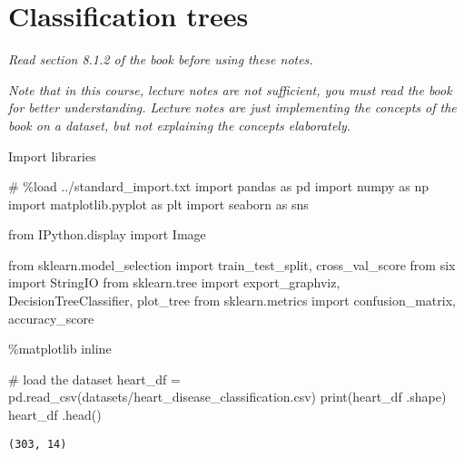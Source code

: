 \documentclass[
  letterpaper,
  DIV=11,
  numbers=noendperiod]{scrreprt}
\newenvironment{Shaded}{\begin{snugshade}}{\end{snugshade}}
\newcommand{\BuiltInTok}[1]{\textcolor[rgb]{0.00,0.23,0.31}{#1}}
\newcommand{\CommentTok}[1]{\textcolor[rgb]{0.37,0.37,0.37}{#1}}
\newcommand{\ImportTok}[1]{\textcolor[rgb]{0.00,0.46,0.62}{#1}}
\newcommand{\NormalTok}[1]{\textcolor[rgb]{0.00,0.23,0.31}{#1}}
\newcommand{\OperatorTok}[1]{\textcolor[rgb]{0.37,0.37,0.37}{#1}}
\newcommand{\StringTok}[1]{\textcolor[rgb]{0.13,0.47,0.30}{#1}}
\begin{document}
\chapter{Classification trees}\label{classification-trees}

\emph{Read section 8.1.2 of the book before using these notes.}

\emph{Note that in this course, lecture notes are not sufficient, you
must read the book for better understanding. Lecture notes are just
implementing the concepts of the book on a dataset, but not explaining
the concepts elaborately.}

Import libraries

\begin{Shaded}
\begin{Highlighting}[]
\CommentTok{\# \%load ../standard\_import.txt}
\ImportTok{import}\NormalTok{ pandas }\ImportTok{as}\NormalTok{ pd}
\ImportTok{import}\NormalTok{ numpy }\ImportTok{as}\NormalTok{ np}
\ImportTok{import}\NormalTok{ matplotlib.pyplot }\ImportTok{as}\NormalTok{ plt}
\ImportTok{import}\NormalTok{ seaborn }\ImportTok{as}\NormalTok{ sns}

\ImportTok{from}\NormalTok{ IPython.display }\ImportTok{import}\NormalTok{ Image}

\ImportTok{from}\NormalTok{ sklearn.model\_selection }\ImportTok{import}\NormalTok{ train\_test\_split, cross\_val\_score}
\ImportTok{from}\NormalTok{ six }\ImportTok{import}\NormalTok{ StringIO}
\ImportTok{from}\NormalTok{ sklearn.tree }\ImportTok{import}\NormalTok{ export\_graphviz, DecisionTreeClassifier, plot\_tree}
\ImportTok{from}\NormalTok{ sklearn.metrics }\ImportTok{import}\NormalTok{ confusion\_matrix, accuracy\_score}

\OperatorTok{\%}\NormalTok{matplotlib inline}
\end{Highlighting}
\end{Shaded}

\begin{Shaded}
\begin{Highlighting}[]
\CommentTok{\# load the dataset}
\NormalTok{heart\_df  }\OperatorTok{=}\NormalTok{ pd.read\_csv(}\StringTok{\textquotesingle{}datasets/heart\_disease\_classification.csv\textquotesingle{}}\NormalTok{)}
\BuiltInTok{print}\NormalTok{(heart\_df .shape)}
\NormalTok{heart\_df .head()}
\end{Highlighting}
\end{Shaded}

\begin{verbatim}
(303, 14)
\end{verbatim}
\end{document}
